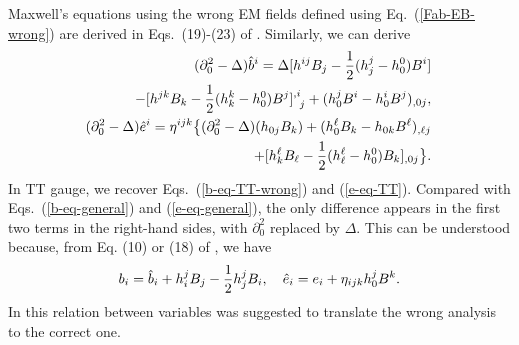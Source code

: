\documentclass[twocolumn,amsmath,amssymb]{revtex4}
\newcommand{\bea}{\begin{eqnarray}}
\newcommand{\eea}{\end{eqnarray}}
\begin{document}
Maxwell's equations using the wrong EM fields defined using Eq.\ (\ref{Fab-EB-wrong}) are derived in Eqs.\ (19)-(23) of \cite{EM-definition}. Similarly, we can derive
\bea
   & & \hskip -.4cm
       ( \partial_0^2 - \Delta ) \hat b^i
       = \Delta [ h^{ij} B_j
       - {1 \over 2} ( h^j_j - h^0_0 ) B^i ]
   \nonumber \\
   & & \hskip -.4cm
       \qquad
       - [ h^{jk} B_k - {1 \over 2}
       ( h^k_k - h^0_0 ) B^j ]^{,i}_{\;\;j}
       + ( h^j_0 B^i - h^i_0 B^j )_{,0j},
   \label{b-eq-general-wrong} \\
   & & \hskip -.4cm
       ( \partial_0^2 - \Delta ) \hat e^i
       = \eta^{ijk} \big\{
       ( \partial_0^2 - \Delta ) ( h_{0j} B_k )
       + ( h_0^\ell B_k - h_{0k} B^\ell )_{,\ell j}
   \nonumber \\
   & & \hskip -.4cm
       \qquad
       + [ h_k^\ell B_\ell
       - {1 \over 2} ( h^\ell_\ell - h^0_0 ) B_k ]_{,0j}
       \big\}.
   \label{e-eq-general-wrong}
\eea
In TT gauge, we recover Eqs.\ (\ref{b-eq-TT-wrong}) and (\ref{e-eq-TT}). Compared with Eqs.\ (\ref{b-eq-general}) and (\ref{e-eq-general}), the only difference appears in the first two terms in the right-hand sides, with $\partial_0^2$ replaced by $\Delta$. This can be understood because, from Eq. (10) or (18) of \cite{EM-definition}, we have
\bea
   b_i = \hat b_i + h^j_i B_j - {1 \over 2} h^j_j B_i, \quad
   \hat e_i = e_i + \eta_{ijk} h^j_0 B^k.
   \label{hab-b}
\eea
In \cite{EM-definition} this relation between variables was suggested to translate the wrong analysis to the correct one.
\end{document}
